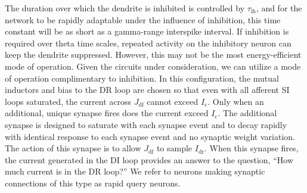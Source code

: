 \documentclass[twocolumn]{article}
\begin{document}
The duration over which the dendrite is inhibited is controlled by $\tau_{\mathrm{ih}}$, and for the network to be rapidly adaptable under the influence of inhibition, this time constant will be as short as a gamma-range interspike interval. If inhibition is required over theta time scales, repeated activity on the inhibitory neuron can keep the dendrite suppressed. However, this may not be the most energy-efficient mode of operation. Given the circuits under consideration, we can utilize a mode of operation complimentary to inhibition. In this configuration, the mutual inductors and bias to the DR loop are chosen so that even with all afferent SI loops saturated, the current across $J_{\mathrm{df}}$ cannot exceed $I_{\mathrm{c}}$. Only when an additional, unique synapse fires does the current exceed $I_{\mathrm{c}}$. The additional synapse is designed to saturate with each synapse event and to decay rapidly with identical response to each synapse event and no synaptic weight variation. The action of this synapse is to allow $J_{\mathrm{df}}$ to sample $I_{\mathrm{dr}}$. When this synapse fires, the current generated in the DI loop provides an answer to the question, ``How much current is in the DR loop?'' We refer to neurons making synaptic connections of this type as rapid query neurons. 
\end{document}
